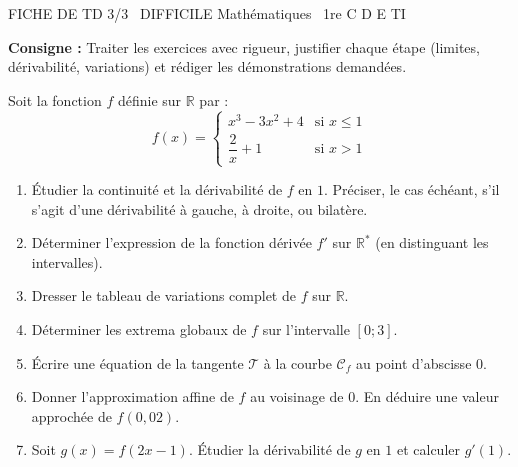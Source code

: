 \documentclass[11pt]{article}
\begin{document}
\begin{tcolorbox}[enhanced,colback=popink,colframe=popink,arc=10pt,boxrule=0pt,left=12pt,right=12pt,top=9pt,bottom=9pt]
{\color{white}\popxbold\small FICHE DE TD 3/3 \textbullet\ DIFFICILE \hfill Mathématiques \textbullet\ 1re C D E TI\par}
\end{tcolorbox}
\vspace{4pt}
\noindent\textbf{Consigne :} Traiter les exercices avec rigueur, justifier chaque étape (limites, dérivabilité, variations) et rédiger les démonstrations demandées.

\begin{exercice}
Soit la fonction $f$ définie sur $\mathbb{R}$ par :
\[
f(x) = \begin{cases}
x^3 - 3x^2 + 4 & \text{si } x \leqslant 1 \\
\dfrac{2}{x} + 1 & \text{si } x > 1
\end{cases}
\]
\begin{enumerate}
    \item Étudier la continuité et la dérivabilité de $f$ en $1$. Préciser, le cas échéant, s'il s'agit d'une dérivabilité à gauche, à droite, ou bilatère.
    \item Déterminer l'expression de la fonction dérivée $f'$ sur $\mathbb{R}^*$ (en distinguant les intervalles).
    \item Dresser le tableau de variations complet de $f$ sur $\mathbb{R}$.
    \item Déterminer les extrema globaux de $f$ sur l'intervalle $[0 ; 3]$.
    \item Écrire une équation de la tangente $\mathcal{T}$ à la courbe $\mathcal{C}_f$ au point d'abscisse $0$.
    \item Donner l'approximation affine de $f$ au voisinage de $0$. En déduire une valeur approchée de $f(0,02)$.
    \item Soit $g(x) = f(2x-1)$. Étudier la dérivabilité de $g$ en $1$ et calculer $g'(1)$.
\end{enumerate}
\end{exercice}
\end{document}
